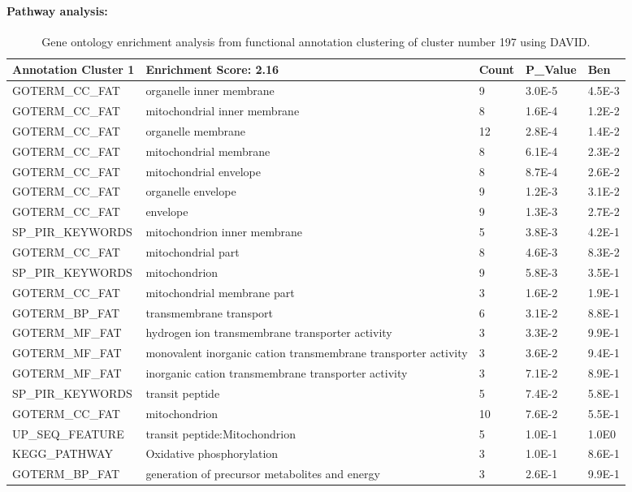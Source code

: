 \paragraph{Pathway analysis:}
\begin{sidewaystable}
    \begin{tabular}{l l l l l }
      \toprule
	\textbf{Annotation Cluster 1}	& \textbf{Enrichment Score: 2.16}	& \textbf{Count}	& \textbf{P\_Value}	& \textbf{Ben}\\ %
      \midrule
	GOTERM\_CC\_FAT	& organelle inner membrane		& 9	& 3.0E-5	& 4.5E-3\\ 
	GOTERM\_CC\_FAT	& mitochondrial inner membrane		& 8	& 1.6E-4	& 1.2E-2\\ 
	GOTERM\_CC\_FAT	& organelle membrane			& 12	& 2.8E-4	& 1.4E-2\\ 
	GOTERM\_CC\_FAT	& mitochondrial membrane		& 8	& 6.1E-4	& 2.3E-2\\ 
	GOTERM\_CC\_FAT	& mitochondrial envelope 		& 8	& 8.7E-4	& 2.6E-2\\ 
	GOTERM\_CC\_FAT	& organelle envelope			& 9	& 1.2E-3	& 3.1E-2\\ 
	GOTERM\_CC\_FAT	& envelope				& 9	& 1.3E-3	& 2.7E-2\\ 
	SP\_PIR\_KEYWORDS	&mitochondrion inner membrane	& 5	& 3.8E-3	& 4.2E-1\\ 
	GOTERM\_CC\_FAT	& mitochondrial part			& 8	& 4.6E-3	& 8.3E-2\\ 
	SP\_PIR\_KEYWORDS	& mitochondrion			& 9	& 5.8E-3	& 3.5E-1\\ 
	GOTERM\_CC\_FAT	& mitochondrial membrane part		& 3	& 1.6E-2	& 1.9E-1\\ 
	GOTERM\_BP\_FAT	& transmembrane transport		& 6	& 3.1E-2	& 8.8E-1\\ 
	GOTERM\_MF\_FAT	& hydrogen ion transmembrane transporter activity  & 3	& 3.3E-2  & 9.9E-1\\ 
	GOTERM\_MF\_FAT & monovalent inorganic cation transmembrane transporter activity & 3	& 3.6E-2 & 9.4E-1\\ 
	GOTERM\_MF\_FAT	& inorganic cation transmembrane transporter activity & 3	& 7.1E-2 & 8.9E-1\\ 
	SP\_PIR\_KEYWORDS &transit peptide			& 5	& 7.4E-2	& 5.8E-1\\ 
	GOTERM\_CC\_FAT	& mitochondrion 			& 10	& 7.6E-2	& 5.5E-1\\ 
	UP\_SEQ\_FEATURE	& transit peptide:Mitochondrion	& 5	& 1.0E-1	& 1.0E0\\ 
	KEGG\_PATHWAY	& Oxidative phosphorylation		& 3	& 1.0E-1	& 8.6E-1\\
	GOTERM\_BP\_FAT	& generation of precursor metabolites and energy & 3	& 2.6E-1 & 9.9E-1\\
      \bottomrule
    \end{tabular}
      \caption{Gene ontology enrichment analysis from functional annotation clustering of cluster number 197 using DAVID.
      \label{table:funAnno}}
\end{sidewaystable}

